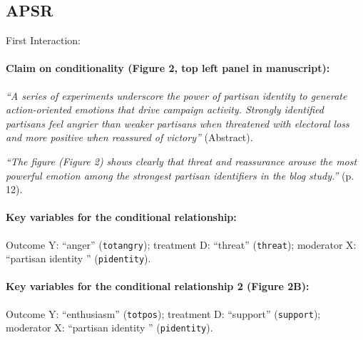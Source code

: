 \documentclass[12pt]{article}
\begin{document}
\clearpage

\subsection{\citet{huddy2015expressive} APSR } \label{huddy}

\noindent First Interaction:

\paragraph{Claim on conditionality (Figure 2, top left panel in manuscript):} \emph{``A series of
  experiments underscore the power of partisan identity to generate
  action-oriented emotions that drive campaign activity. Strongly
  identified partisans feel angrier than weaker partisans when
  threatened with electoral loss and more positive when reassured of
  victory''} (Abstract).

\emph{``The figure (Figure 2) shows clearly that threat and reassurance arouse the most powerful emotion among the strongest partisan identifiers in the blog study.''} (p. 12).

\paragraph{Key variables for the conditional relationship:} Outcome Y:
``anger'' (\texttt{totangry}); treatment D:
``threat'' (\texttt{threat}); moderator X: ``partisan identity '' (\texttt{pidentity}). 

\paragraph{Key variables for the conditional relationship 2 (Figure 2B):} Outcome Y:
``enthusiasm'' (\texttt{totpos}); treatment D: ``support'' (\texttt{support}); moderator X: ``partisan identity '' (\texttt{pidentity}).  

\clearpage
\end{document}
